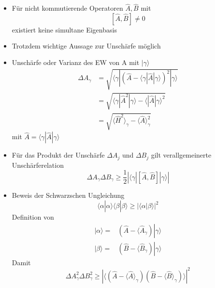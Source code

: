 \documentclass[10pt,article,colorback,accentcolor=tud9d]{scrartcl}
\begin{document}
  \begin{itemize}
    \item Für nicht kommutierende Operatoren $\hat{A},\hat{B}$ mit 
      $$
      \left[\hat{A},\hat{B}\right]\neq 0
      $$
      existiert keine simultane Eigenbasis
    \item Trotzdem wichtige Aussage zur Unschärfe möglich
    \item Unschärfe oder Varianz des EW von A mit $\left.\right|\gamma\rangle$
      \begin{equation}
      \begin{aligned}
        \Delta A_\gamma&=\sqrt{\langle\gamma\left.\right|\left(\hat{A}-\langle\gamma\left|\hat{A}\right|\gamma\rangle\right)^2\left.\right|\gamma\rangle}\\
        &=\sqrt{\langle\gamma\left|\hat{A}^2\right|\gamma\rangle-\langle\left|\hat{A}\right|\gamma\rangle^2}\\
        &=\sqrt{\langle\hat{H}^2\rangle_\gamma-\langle\hat{A}\rangle_\gamma^2}
      \end{aligned}        
      \end{equation}
      mit $\hat{A}=\langle\gamma\left|\hat{A}\right|\gamma\rangle$
    \item Für das Produkt der Unschärfe $\Delta A_j$ und $\Delta B_j$ gilt verallgemeinerte Unschärferelation
      \begin{equation}
      \Delta A_\gamma \Delta B_\gamma \geq \frac{1}{2}\left|\langle\gamma\left|\left[ \hat{A},\hat{B}\right]\right|\gamma\rangle\right|
      \end{equation}
    \item Beweis der Schwarzschen Ungleichung
      \begin{equation}
      \langle\alpha\left.\right|\alpha\rangle\langle\beta\left.\right|\beta\rangle \geq \left|\langle\alpha\left|\right.\beta\rangle\right|^2
      \end{equation}
      Definition von 
      \begin{equation}
      \begin{aligned}
        \left.\right|\alpha\rangle=&\left(\hat{A}-\langle\hat{A}_\gamma\right)\left.\right|\gamma\rangle\\
        \left.\right|\beta\rangle=&\left(\hat{B}-\langle\hat{B}_\gamma\right)\left.\right|\gamma\rangle
      \end{aligned}
      \end{equation}
      Damit 
      \begin{equation}
      \Delta A_\gamma^2\Delta B_\gamma^2 \geq \left|\langle \left(\hat{A}-\langle\hat{A}\rangle_\gamma\right)\left(\hat{B}-\langle\hat{B}\rangle_\gamma\right)\rangle\right|^2

\end{equation}
\end{itemize}
\end{document}
